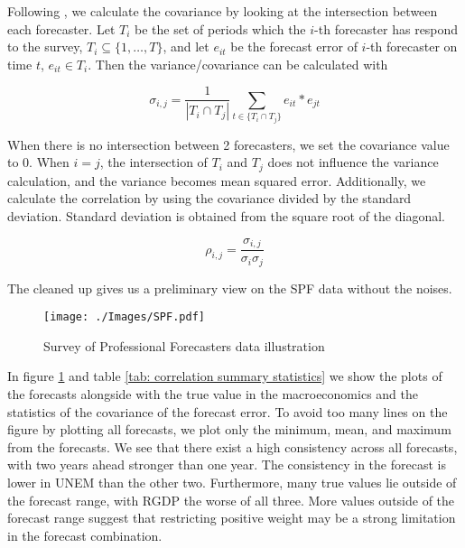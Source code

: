 \documentclass[11pt]{article}
\begin{document}
Following \cite{Matsypura2018}, we calculate the covariance by looking
at the intersection between each forecaster. Let $T_i$ be the set of periods which the $i$-th forecaster has respond to the survey, $T_i \subseteq \{1,\ldots,T\}$, and let $e_{it}$ be the forecast error of $i$-th forecaster on time $t$, $e_{it} \in T_i$. Then the variance/covariance can be calculated with

\begin{equation}
\label{equation}
\sigma_{i,j} = \frac{1}{|T_i \cap T_j|}\sum_{t\in \{T_i \cap T_j\}} e_{it}*e_{jt}
\end{equation}

When there is no intersection between 2 forecasters, we set the
covariance value to 0. When $i=j$, the intersection of $T_i$ and $T_j$ does not influence the variance calculation, and the variance becomes mean squared error. Additionally, we calculate the correlation by
using the covariance divided by the standard deviation. Standard
deviation is obtained from the square root of the diagonal.

\begin{equation}
\label{eqn: cov2cor}
\rho_{i,j} = \frac{\sigma_{i,j}}{\sigma_{i}\sigma_{j}}
\end{equation}

The cleaned up gives us a preliminary view on the SPF data without the
noises.

\begin{figure}[!h]
\centering
\texttt{[image: ./Images/SPF.pdf]}
\caption{Survey of Professional Forecasters data illustration}\label{fig: SPF data illustration}
\end{figure}

In figure \ref{fig: SPF data illustration} and table
\ref{tab: correlation summary statistics} we show the plots of the
forecasts alongside with the true value in the macroeconomics and the
statistics of the covariance of the forecast error. To avoid too many
lines on the figure by plotting all forecasts, we plot only the minimum,
mean, and maximum from the forecasts. We see that there exist a high
consistency across all forecasts, with two years ahead stronger than one
year. The consistency in the forecast is lower in UNEM than the other
two. Furthermore, many true values lie outside of the forecast range,
with RGDP the worse of all three. More values outside of the forecast
range suggest that restricting positive weight may be a strong
limitation in the forecast combination.
\end{document}
